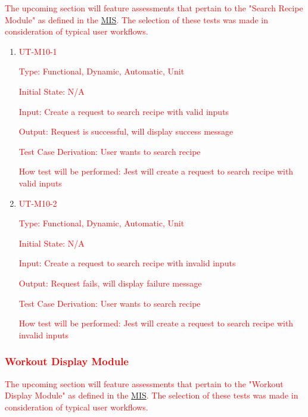 \documentclass[12pt, titlepage]{article}
\begin{document}
\textcolor{red}{The upcoming section will feature assessments that pertain to the "Search Recipe Module" as defined in the \href{https://github.com/BillNguyen1999/REVITALIZE/blob/main/docs/Design/SoftDetailedDes/MIS.pdf}{\color{blue}MIS}. The selection of these tests was made in consideration of typical user workflows.}

\begin{enumerate}

	\item{\textcolor{red}{UT-M10-1\\}}

	\textcolor{red}{Type: Functional, Dynamic, Automatic, Unit}

	\textcolor{red}{Initial State: N/A}

	\textcolor{red}{Input: Create a request to search recipe with valid inputs}

	\textcolor{red}{Output: Request is successful, will display success message}

	\textcolor{red}{Test Case Derivation: User wants to search recipe}

	\textcolor{red}{How test will be performed: Jest will create a request to search recipe with valid inputs}

	\item{\textcolor{red}{UT-M10-2\\}}

	\textcolor{red}{Type: Functional, Dynamic, Automatic, Unit}

	\textcolor{red}{Initial State: N/A}

	\textcolor{red}{Input: Create a request to search recipe with invalid inputs}

	\textcolor{red}{Output: Request fails, will display failure message}

	\textcolor{red}{Test Case Derivation: User wants to search recipe}

	\textcolor{red}{How test will be performed: Jest will create a request to search recipe with invalid inputs}

\end{enumerate}

\subsubsection{\textcolor{red}{Workout Display Module}}

\textcolor{red}{The upcoming section will feature assessments that pertain to the "Workout Display Module" as defined in the \href{https://github.com/BillNguyen1999/REVITALIZE/blob/main/docs/Design/SoftDetailedDes/MIS.pdf}{\color{blue}MIS}. The selection of these tests was made in consideration of typical user workflows.}
\end{document}
